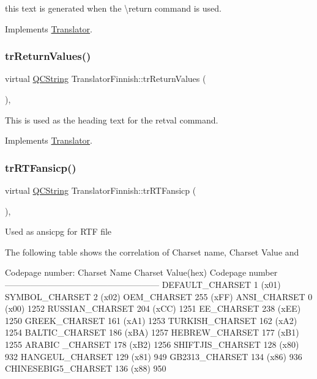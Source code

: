 this text is generated when the \textbackslash{}return command is used. 

Implements \mbox{\hyperlink{class_translator}{Translator}}.

\mbox{\label{class_translator_finnish_a293cf5946c17777566db16ae204cd752}} 
\subsubsection{\texorpdfstring{trReturnValues()}{trReturnValues()}}
{\footnotesize\ttfamily virtual \mbox{\hyperlink{class_q_c_string}{Q\+C\+String}} Translator\+Finnish\+::tr\+Return\+Values (\begin{DoxyParamCaption}{ }\end{DoxyParamCaption})\hspace{0.3cm}{\ttfamily [inline]}, {\ttfamily [virtual]}}

This is used as the heading text for the retval command. 

Implements \mbox{\hyperlink{class_translator}{Translator}}.

\mbox{\label{class_translator_finnish_ac423c0b2f218db44410075122cc3e338}} 
\subsubsection{\texorpdfstring{trRTFansicp()}{trRTFansicp()}}
{\footnotesize\ttfamily virtual \mbox{\hyperlink{class_q_c_string}{Q\+C\+String}} Translator\+Finnish\+::tr\+R\+T\+Fansicp (\begin{DoxyParamCaption}{ }\end{DoxyParamCaption})\hspace{0.3cm}{\ttfamily [inline]}, {\ttfamily [virtual]}}

Used as ansicpg for R\+TF file

The following table shows the correlation of Charset name, Charset Value and 
\begin{DoxyPre}
Codepage number:
Charset Name       Charset Value(hex)  Codepage number
------------------------------------------------------
DEFAULT\_CHARSET           1 (x01)
SYMBOL\_CHARSET            2 (x02)
OEM\_CHARSET             255 (xFF)
ANSI\_CHARSET              0 (x00)            1252
RUSSIAN\_CHARSET         204 (xCC)            1251
EE\_CHARSET              238 (xEE)            1250
GREEK\_CHARSET           161 (xA1)            1253
TURKISH\_CHARSET         162 (xA2)            1254
BALTIC\_CHARSET          186 (xBA)            1257
HEBREW\_CHARSET          177 (xB1)            1255
ARABIC \_CHARSET         178 (xB2)            1256
SHIFTJIS\_CHARSET        128 (x80)             932
HANGEUL\_CHARSET         129 (x81)             949
GB2313\_CHARSET          134 (x86)             936
CHINESEBIG5\_CHARSET     136 (x88)             950
\end{DoxyPre}
 

